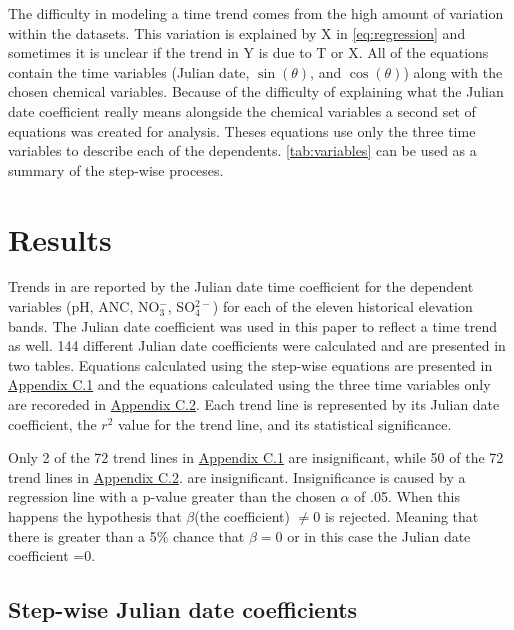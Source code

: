

The difficulty in modeling a time trend comes from the high amount of variation within the datasets.  
This variation is explained by X in \autoref{eq:regression} and sometimes it is unclear if the trend in Y is due to T or X.
All of the equations contain the time variables (Julian date, $\sin(\theta)$, and $\cos(\theta)$) along with the chosen chemical variables.  
Because of the difficulty of explaining what the Julian date coefficient really means alongside the chemical variables a second set of equations was created for analysis.
Theses equations use only the three time variables to describe each of the dependents.
\autoref{tab:variables} can be used as a summary of the step-wise proceses.



\section{Results}
Trends in \citet{robinson2008ph} are reported by the Julian date time coefficient for the dependent variables (pH, ANC, NO$_3^-$, SO$_4^{2-}$)  for each of the eleven historical elevation bands.
The Julian date coefficient was used in this paper to reflect a time trend as well.
144 different Julian date coefficients were calculated and are presented in two tables.  
Equations calculated using the step-wise equations are presented in \hyperref[sec:SWJD]{Appendix C.1} and the equations calculated using the three time variables only are recoreded in  \hyperref[sec:TVJD]{Appendix C.2}.
Each trend line is represented by its Julian date coefficient, the $r^2$ value for the trend line, and its statistical significance.

Only 2 of the 72 trend lines in \hyperref[sec:SWJD]{Appendix C.1} are insignificant, while 50 of the 72 trend lines in  \hyperref[sec:TVJD]{Appendix C.2}. are insignificant.  
Insignificance is caused by a regression line with a p-value greater than the chosen $\alpha$ of .05.
When this happens the hypothesis that $\beta$(the coefficient) $\neq 0$  is rejected.
Meaning that there is greater than a 5$\%$ chance that $\beta=0$ or in this case the Julian date coefficient =0. 

\subsection{Step-wise Julian date coefficients}

